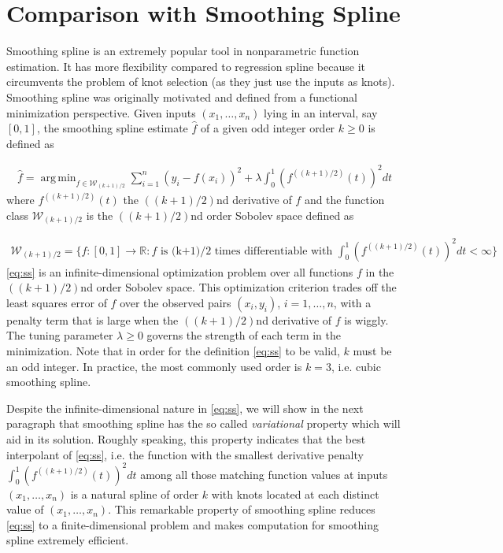 \documentclass[a4paper]{article}
\DeclareMathOperator*{\argmin}{arg\,min}
\newcommand{\RR}{\mathbb{R}}
\renewcommand{\cal}{\mathcal}
\begin{document}
\section{Comparison with Smoothing Spline}
\label{sec:comp_ss}
Smoothing spline is an extremely popular tool in nonparametric function estimation. It has more flexibility compared to regression spline because it circumvents the problem of knot selection (as they just use the inputs as knots). Smoothing spline was originally motivated and defined from a functional minimization perspective. Given inputs $(x_1,\ldots, x_n)$ lying in an interval, say $[0, 1]$, the smoothing spline estimate $\hat{f}$ of a given odd integer order $k\geq 0$ is defined as

\begin{align}
\hat{f} = \argmin_{f\in\cal{W}_{(k+1)/2}}\sum_{i=1}^n (y_i - f(x_i))^2 + \lambda \int_0^1 (f^{((k+1)/2)}(t))^2dt
\label{eq:ss}
\end{align}
where $f^{((k+1)/2)}(t)$ the $((k+1)/2)$nd derivative of $f$ and the function class $\cal{W}_{(k+1)/2}$ is the $((k+1)/2)$nd order Sobolev space defined as

\begin{align*}
\cal{W}_{(k+1)/2} = \big\{f:[0,1]\rightarrow \RR:f\text{ is (k+1)/2 times differentiable with } \int_0^1(f^{((k+1)/2)}(t))^2dt<\infty\big\}
\end{align*}
\eqref{eq:ss} is an infinite-dimensional optimization problem over all functions $f$ in the $((k+1)/2)$nd order Sobolev space. This optimization criterion trades off the least squares error of $f$ over the observed pairs $(x_i, y_i)$, $i=1,\ldots, n$, with a penalty term that is large when the $((k+1)/2)$nd derivative of $f$ is wiggly. The tuning parameter $\lambda \geq 0$ governs the strength of each term in the minimization. Note that in order for the definition \eqref{eq:ss} to be valid, $k$ must be an odd integer. In practice, the most commonly used order is $k = 3$, i.e. cubic smoothing spline. 

Despite the infinite-dimensional nature in \eqref{eq:ss}, we will show in the next paragraph that smoothing spline has the so called \textit{variational} property which will aid in its solution. Roughly speaking, this property indicates that the best interpolant of \eqref{eq:ss}, i.e. the function with the smallest derivative penalty $\int_0^1(f^{((k+1)/2)}(t))^2dt$ among all those matching function values at inputs $(x_1,\ldots, x_n)$ is a natural spline of order $k$ with knots located at each distinct value of $(x_1,\ldots, x_n)$. This remarkable property of smoothing spline reduces \eqref{eq:ss} to a finite-dimensional problem and makes computation for smoothing spline extremely efficient.
\end{document}
